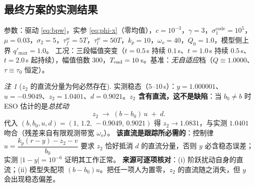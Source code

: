 \documentclass[11pt]{article}
\theoremstyle{remark}\newtheorem{remark}{注}
\begin{document}
\subsection{最终方案的实测结果}\label{sec:bpw-result}
参数：驱动 \eqref{eq:bpw}，实参 \eqref{eq:phi-x}（零均值），$c=10^{-3}$，$\gamma=3$，$\sigma_1^{\mathrm{code}}=10^{5}$，$\mu=0.03$，$\sigma_2=5$，$\tau_f^{w}=5T$，$\tau_l^{w}=50T$，$k_p=10$，$\omega_o=40$，$Q_0=1.0$，模型侧上界 $q'_{\max}=1.0$。
工况：三段幅值突变（$t=0.5$\,s 持续 $0.1$\,s、$t=1.0$\,s 持续 $0.5$\,s、$t=2.0$\,s 起持续），幅值倍数 $300$，$T_{\rm end}=10$\,s。基准：\emph{无自适应}档（$Q\equiv1.0000$、$\tau\equiv\tau_0$ 恒定）。
\begin{remark}[$z_2$ 的直流分量为何必然存在]\label{rem:z2dc}
实测稳态（$5$--$10$\,s）：$y=1.000001$、$u=-0.9049$、$z_2=1.0401$、$d=0.9021$。\textbf{$z_2$ 含有直流，这不是缺陷}：当 $b_0\ne b$ 时 ESO 估计的是\emph{总扰动}
\begin{equation}
  z_2\;\longrightarrow\;(b-b_0)\,u\;+\;d .
  \label{eq:z2dc}
\end{equation}
代入 $(b,b_0,u,d)=(1,\,1.2,\,-0.9049,\,0.9021)$ 得 $z_2\to1.0831$，与实测 $1.0401$ 吻合（残差来自有限观测带宽 $\omega_o$）。
\textbf{该直流是跟踪所必需的}：控制律 $u=\dfrac{k_p(r-y)-z_2-v}{b_0}$ 要求 $z_2$ 恰好抵消 $d$ 的直流分量，否则 $y$ 必含稳态误差；实测 $|1-y|=10^{-6}$ 证明其工作正常。
\textbf{来源可逐项核对}：(i) 阶跃扰动自身的直流；(ii) 模型失配项 $(b-b_0)u$。把任一项人为置零，$z_2$ 的直流随之消失，但 $y$ 会出现稳态偏差。
\end{remark}
\end{document}
